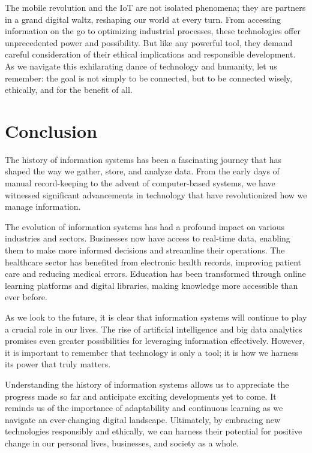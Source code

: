 \documentclass[
  letterpaper,
  DIV=11,
  numbers=noendperiod]{scrreprt}
\begin{document}
The mobile revolution and the IoT are not isolated phenomena; they are
partners in a grand digital waltz, reshaping our world at every turn.
From accessing information on the go to optimizing industrial processes,
these technologies offer unprecedented power and possibility. But like
any powerful tool, they demand careful consideration of their ethical
implications and responsible development. As we navigate this
exhilarating dance of technology and humanity, let us remember: the goal
is not simply to be connected, but to be connected wisely, ethically,
and for the benefit of all.

\section{Conclusion}\label{conclusion}

The history of information systems has been a fascinating journey that
has shaped the way we gather, store, and analyze data. From the early
days of manual record-keeping to the advent of computer-based systems,
we have witnessed significant advancements in technology that have
revolutionized how we manage information.

The evolution of information systems has had a profound impact on
various industries and sectors. Businesses now have access to real-time
data, enabling them to make more informed decisions and streamline their
operations. The healthcare sector has benefited from electronic health
records, improving patient care and reducing medical errors. Education
has been transformed through online learning platforms and digital
libraries, making knowledge more accessible than ever before.

As we look to the future, it is clear that information systems will
continue to play a crucial role in our lives. The rise of artificial
intelligence and big data analytics promises even greater possibilities
for leveraging information effectively. However, it is important to
remember that technology is only a tool; it is how we harness its power
that truly matters.

Understanding the history of information systems allows us to appreciate
the progress made so far and anticipate exciting developments yet to
come. It reminds us of the importance of adaptability and continuous
learning as we navigate an ever-changing digital landscape. Ultimately,
by embracing new technologies responsibly and ethically, we can harness
their potential for positive change in our personal lives, businesses,
and society as a whole.
\end{document}
